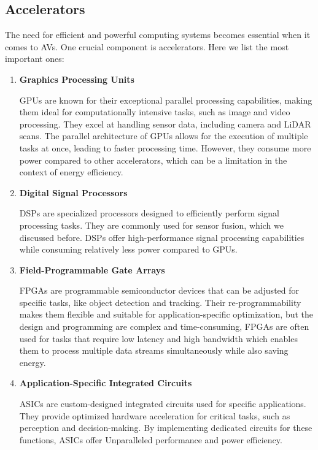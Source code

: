 \documentclass[10pt,oneside,english,a4paper]{article}
\begin{document}
\subsection{Accelerators}
\par The need for efficient and powerful computing systems becomes essential when it comes to AVs. One crucial component is accelerators. Here we list the most important ones:
\begin{enumerate}
    \item \textbf{Graphics Processing Units}
    \par GPUs are known for their exceptional parallel processing capabilities, making them ideal for computationally intensive tasks, such as image and video processing. They excel at handling sensor data, including camera and LiDAR scans. The parallel architecture of GPUs allows for the execution of multiple tasks at once, leading to faster processing time. However, they consume more power compared to other accelerators, which can be a limitation in the context of energy efficiency.
    \item \textbf{Digital Signal Processors}
    \par DSPs are specialized processors designed to efficiently perform signal processing tasks. They are commonly used for sensor fusion, which we discussed before. DSPs offer high-performance signal processing capabilities while consuming relatively less power compared to GPUs. 
    \item \textbf{Field-Programmable Gate Arrays}
    \par FPGAs are programmable semiconductor devices that can be adjusted for specific tasks, like object detection and tracking. Their re-programmability makes them flexible and suitable for application-specific optimization, but the design and programming are complex and time-consuming, FPGAs are often used for tasks that require low latency and high bandwidth which enables them to process multiple data streams simultaneously while also saving energy.
    \item \textbf{Application-Specific Integrated Circuits}
    \par ASICs are custom-designed integrated circuits used for specific applications. They provide optimized hardware acceleration for critical tasks, such as perception and decision-making. By implementing dedicated circuits for these functions, ASICs offer Unparalleled performance and power efficiency.\cite{edgecomputing, computerarch, researchresults}
\end{enumerate}
\end{document}
